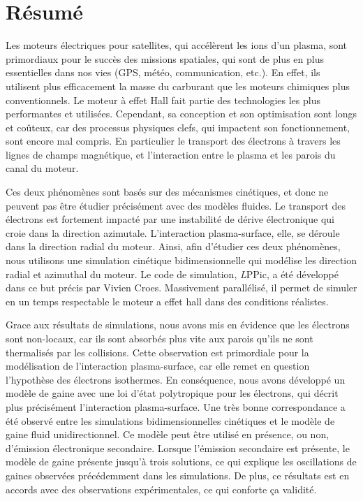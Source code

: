 



\chapter*{Résumé}

Les moteurs électriques pour satellites, qui accélèrent les ions d'un plasma, sont primordiaux pour le succès des missions spatiales, qui sont de plus en plus essentielles dans nos vies (GPS, météo, communication, etc.).
En effet, ils utilisent plus efficacement la masse du carburant que les moteurs chimiques plus conventionnels. 
Le moteur à effet Hall fait partie des technologies les plus performantes et utilisées.
Cependant, sa conception et son optimisation sont longs et coûteux, car des processus physiques clefs, qui impactent son fonctionnement, sont encore mal compris.
En particulier le transport des électrons à travers les lignes de champs magnétique, et l'interaction entre le plasma et les parois du canal du moteur. 

Ces deux phénomènes sont basés sur des mécanismes cinétiques, et donc ne peuvent pas être étudier précisément avec des modèles fluides.
Le transport des électrons est fortement impacté par une instabilité de dérive électronique qui croie dans la direction azimutale.
L'interaction plasma-surface, elle, se déroule dans la direction radial du moteur.
Ainsi, afin d'étudier ces deux phénomènes, nous utilisons une simulation cinétique bidimensionnelle qui modélise les direction radial et azimuthal du moteur.
Le code de simulation, {\emph LPPic}, a été développé dans ce but précis par Vivien Croes.
Massivement parallélisé, il permet de simuler en un temps respectable le moteur a effet hall dans des conditions réalistes.
 
Grace aux résultats de simulations, nous avons mis en évidence que les électrons sont non-locaux, car ils sont absorbés plus vite aux parois qu'ils ne sont thermalisés par les collisions.
Cette observation est primordiale pour la modélisation de l'interaction plasma-surface, car elle remet en question l'hypothèse des électrons isothermes.
En conséquence, nous avons développé un modèle de gaine avec une loi d'état polytropique pour les électrons, qui décrit plus précisément l'interaction plasma-surface.
Une très bonne correspondance a été observé entre les simulations bidimensionnelles cinétiques et le modèle de gaine fluid unidirectionnel.
Ce modèle peut être utilisé en présence, ou non, d'émission électronique secondaire.
Lorsque l'émission secondaire est présente, le modèle de gaine présente jusqu'à trois solutions, ce qui explique les oscillations de gaines observées précédemment dans les simulations. 
De plus, ce résultats est en accords avec des observations expérimentales, ce qui conforte ça validité.

